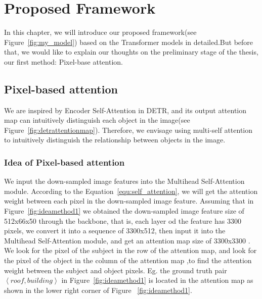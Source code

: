 \chapter{Proposed Framework}
\label{chap:framework}
In this chapter, we will introduce our proposed framework(see Figure~\ref{fig:my_model}) based on the Transformer models in detailed.But before that, we would like to explain our thoughts on the preliminary stage of the thesis, our first method: Pixel-base attention.


\section{Pixel-based attention}\label{sec:pixel_base}

We are inspired by Encoder Self-Attention in DETR, and its output attention map can intuitively distinguish each object in the image(see Figure~\ref{fig:detrattentionmap}). Therefore, we envisage using multi-self attention to intuitively distinguish the relationship between objects in the image.

\subsection{Idea of Pixel-based attention}

We input the down-sampled image features into the Multihead Self-Attention module. According to the Equation~\ref{equ:self_attention}, we will get the attention weight between each pixel in the down-sampled image feature. Assuming that in Figure~\ref{fig:ideamethod1} we obtained the down-sampled image feature size of 512x66x50 through the backbone, that is, each layer od the feature has 3300 pixels, we convert it into a sequence of 3300x512, then input it into the Multihead Self-Attention module, and get an attention map size of 3300x3300 . We look for the pixel of the subject in the row of the attention map, and look for the pixel of the object in the column of the attention map ,to find the attention weight between the subject and object pixels. Eg. the ground truth pair $ \left\langle roof, building \right \rangle $ in Figure~\ref{fig:ideamethod1} is located in the attention map as shown in the lower right corner of Figure ~\ref{fig:ideamethod1}.

